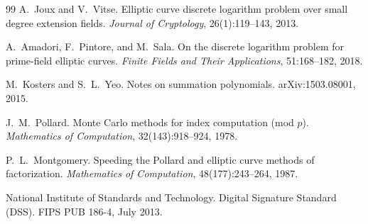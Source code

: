 \documentclass[10pt,a4paper]{article}
\theoremstyle{remark}
\begin{document}
\begin{thebibliography}{99}
A.~Joux and V.~Vitse.
Elliptic curve discrete logarithm problem over small degree extension fields.
\emph{Journal of Cryptology}, 26(1):119--143, 2013.

A.~Amadori, F.~Pintore, and M.~Sala.
On the discrete logarithm problem for prime-field elliptic curves.
\emph{Finite Fields and Their Applications}, 51:168--182, 2018.

M.~Kosters and S.~L.~Yeo.
Notes on summation polynomials.
arXiv:1503.08001, 2015.

J.~M.~Pollard.
Monte Carlo methods for index computation (mod $p$).
\emph{Mathematics of Computation}, 32(143):918--924, 1978.

P.~L.~Montgomery.
Speeding the Pollard and elliptic curve methods of factorization.
\emph{Mathematics of Computation}, 48(177):243--264, 1987.

National Institute of Standards and Technology.
Digital Signature Standard (DSS).
FIPS PUB 186-4, July 2013.

\end{thebibliography}
\end{document}
